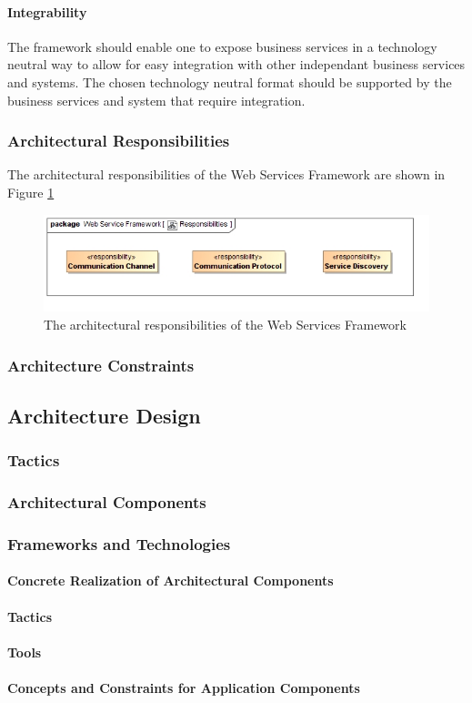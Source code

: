 \paragraph{Integrability}
The framework should enable one to expose business services in a technology
neutral way to allow for easy integration with other independant business
services and systems.  The chosen technology neutral format should be supported
by the business services and system that require integration.

\subsubsection{Architectural Responsibilities}
The architectural responsibilities of the Web Services Framework are shown in 
Figure \ref{fig:webServicesFrameworkResponsibilities}
\begin{figure}[H]
	\begin{center}
	\includegraphics[scale=0.5]{../Diagrams and Charts/Web Services Framework/Responsibilities.jpg}
	\caption{The architectural responsibilities of the Web Services Framework}
	\label{fig:webServicesFrameworkResponsibilities}
	\end{center}
\end{figure}

\subsubsection{Architecture Constraints}
\subsection{Architecture Design}
\subsubsection{Tactics}
\subsubsection{Architectural Components}
\subsubsection{Frameworks and Technologies}
\paragraph{Concrete Realization of Architectural Components}
\paragraph{Tactics}
\paragraph{Tools}
\paragraph{Concepts and Constraints for Application Components}
